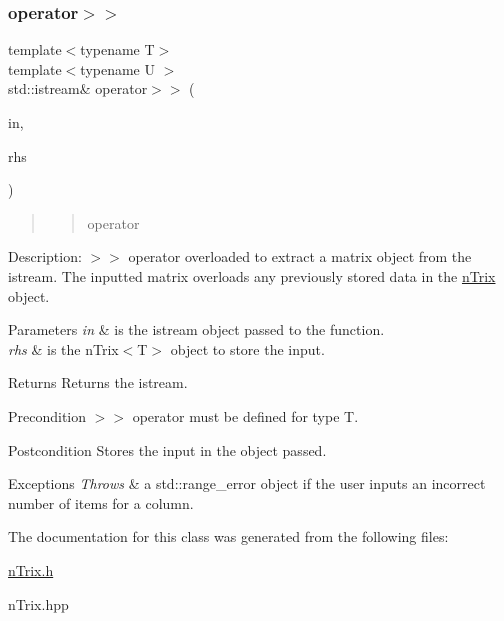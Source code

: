 \subsubsection{\texorpdfstring{operator$>$$>$}{operator>>}}
{\footnotesize\ttfamily template$<$typename T$>$ \\
template$<$typename U $>$ \\
std\+::istream\& operator$>$$>$ (\begin{DoxyParamCaption}\item[{std\+::istream \&}]{in,  }\item[{\hyperlink{classnTrix}{n\+Trix}$<$ U $>$ \&}]{rhs }\end{DoxyParamCaption})\hspace{0.3cm}{\ttfamily [friend]}}



\begin{quote}
\begin{quote}
operator\end{quote}
\end{quote}


Description\+: $>$$>$ operator overloaded to extract a matrix object from the istream. The inputted matrix overloads any previously stored data in the \hyperlink{classnTrix}{n\+Trix} object. 
\begin{DoxyParams}{Parameters}
{\em in} & is the istream object passed to the function. \\
\hline
{\em rhs} & is the n\+Trix$<$\+T$>$ object to store the input. \\
\hline
\end{DoxyParams}
\begin{DoxyReturn}{Returns}
Returns the istream. 
\end{DoxyReturn}
\begin{DoxyPrecond}{Precondition}
$>$$>$ operator must be defined for type T. 
\end{DoxyPrecond}
\begin{DoxyPostcond}{Postcondition}
Stores the input in the object passed. 
\end{DoxyPostcond}

\begin{DoxyExceptions}{Exceptions}
{\em Throws} & a std\+::range\+\_\+error object if the user inputs an incorrect number of items for a column. \\
\hline
\end{DoxyExceptions}


The documentation for this class was generated from the following files\+:\begin{DoxyCompactItemize}
\item 
\hyperlink{nTrix_8h}{n\+Trix.\+h}\item 
n\+Trix.\+hpp\end{DoxyCompactItemize}
